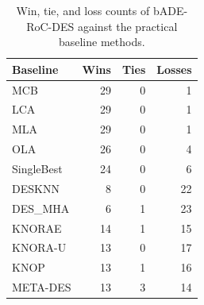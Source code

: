 \begin{table}
\caption{Win, tie, and loss counts of bADE-RoC-DES against the practical baseline methods.}
\label{tab:win-tie-loss}
\begin{tabular}{lrrr}
\toprule
Baseline & Wins & Ties & Losses \\
\midrule
MCB & 29 & 0 & 1 \\
LCA & 29 & 0 & 1 \\
MLA & 29 & 0 & 1 \\
OLA & 26 & 0 & 4 \\
SingleBest & 24 & 0 & 6 \\
DESKNN & 8 & 0 & 22 \\
DES\_MHA & 6 & 1 & 23 \\
KNORAE & 14 & 1 & 15 \\
KNORA-U & 13 & 0 & 17 \\
KNOP & 13 & 1 & 16 \\
META-DES & 13 & 3 & 14 \\
\bottomrule
\end{tabular}
\end{table}
